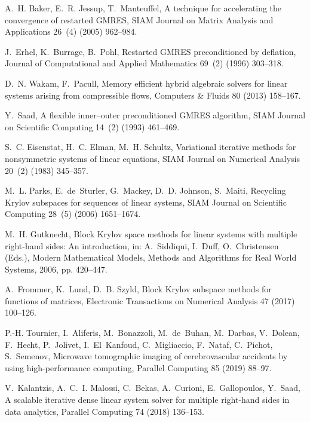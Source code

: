 \documentclass[3p,11pt]{elsarticle}
\begin{document}
\begin{thebibliography}{10}
A.~H. Baker, E.~R. Jessup, T.~Manteuffel, A technique for accelerating the
  convergence of restarted {GMRES}, SIAM Journal on Matrix Analysis and
  Applications 26~(4) (2005) 962--984.

J.~Erhel, K.~Burrage, B.~Pohl, Restarted {GMRES} preconditioned by deflation,
  Journal of Computational and Applied Mathematics 69~(2) (1996) 303--318.

D.~N. Wakam, F.~Pacull, Memory efficient hybrid algebraic solvers for linear
  systems arising from compressible flows, Computers \& Fluids 80 (2013)
  158--167.

Y.~Saad, A flexible inner--outer preconditioned {GMRES} algorithm, SIAM Journal
  on Scientific Computing 14~(2) (1993) 461--469.

S.~C. Eisenstat, H.~C. Elman, M.~H. Schultz, Variational iterative methods for
  nonsymmetric systems of linear equations, SIAM Journal on Numerical Analysis
  20~(2) (1983) 345--357.

M.~L. Parks, E.~de~Sturler, G.~Mackey, D.~D. Johnson, S.~Maiti, Recycling
  {K}rylov subspaces for sequences of linear systems, SIAM Journal on
  Scientific Computing 28~(5) (2006) 1651--1674.

M.~H. Gutknecht, Block {K}rylov space methods for linear systems with multiple
  right-hand sides: An introduction, in: A.~Siddiqui, I.~Duff, O.~Christensen
  (Eds.), Modern Mathematical Models, Methods and Algorithms for Real World
  Systems, 2006, pp. 420--447.

A.~Frommer, K.~Lund, D.~B. Szyld, Block {K}rylov subspace methods for functions
  of matrices, Electronic Transactions on Numerical Analysis 47 (2017)
  100--126.

P.-H. Tournier, I.~Aliferis, M.~Bonazzoli, M.~de~Buhan, M.~Darbas, V.~Dolean,
  F.~Hecht, P.~Jolivet, I.~El~Kanfoud, C.~Migliaccio, F.~Nataf, C.~Pichot,
  S.~Semenov, Microwave tomographic imaging of cerebrovascular accidents by
  using high-performance computing, Parallel Computing 85 (2019) 88--97.

V.~Kalantzis, A.~C.~I. Malossi, C.~Bekas, A.~Curioni, E.~Gallopoulos, Y.~Saad,
  A scalable iterative dense linear system solver for multiple right-hand sides
  in data analytics, Parallel Computing 74 (2018) 136--153.


\end{thebibliography}
\end{document}
